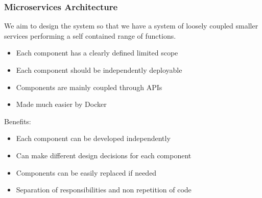 \documentclass{beamer}
\begin{document}
\begin{frame}
  \frametitle{Microservices Architecture}
  We aim to design the system so that we have a system of loosely coupled smaller services performing a self contained range of functions.

  \begin{itemize}
  \item Each component has a clearly defined limited scope
  \item Each component should be independently deployable
  \item Components are mainly coupled through APIs
  \item Made much easier by Docker
  \end{itemize}

  Benefits:

  \begin{itemize}
  \item Each component can be developed independently
  \item Can make different design decisions for each component
  \item Components can be easily replaced if needed
  \item Separation of responsibilities and non repetition of code
    \end{itemize}
\end{frame}
\end{document}
